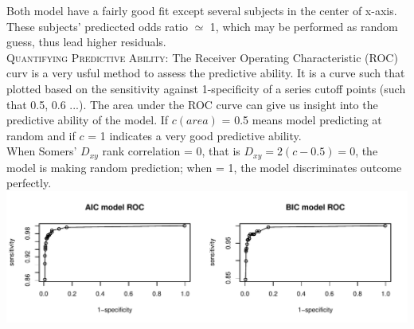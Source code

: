 \documentclass[11pt]{article}\usepackage[]{graphicx}\usepackage[]{color}
\makeatletter
\def\maxwidth{ %
  \ifdim\Gin@nat@width>\linewidth
    \linewidth
  \else
    \Gin@nat@width
  \fi
}
\newenvironment{knitrout}{}{} %
\makeatother
\begin{document}
Both model have a fairly good fit except several subjects in the center of x-axis. These subjects' prediccted odds ratio $\simeq$ 1, which may be performed as random guess, thus lead higher residuals.\\

\textsc{Quantifying Predictive Ability:} The Receiver Operating Characteristic (ROC) curv is a very usful method to assess the predictive ability. It is a curve such that plotted based on the sensitivity against 1-specificity of a series cutoff points (such that 0.5, 0.6 ...). The area under the ROC curve can give us insight into the predictive ability of the model. If $c(area)$ =  0.5 means model predicting at random and if $c$ = 1 indicates a very good predictive ability.\\
When Somers' $D_{xy}$ rank correlation = 0, that is $D_{xy}=2(c-0.5)= 0$, the model is making random prediction; when = 1, the model discriminates outcome perfectly.\\

\begin{knitrout}
\color{fgcolor}
\includegraphics[width=\maxwidth]{figure/ROV_curve} 

\end{knitrout}

\begin{center}
\end{center}
\end{document}
